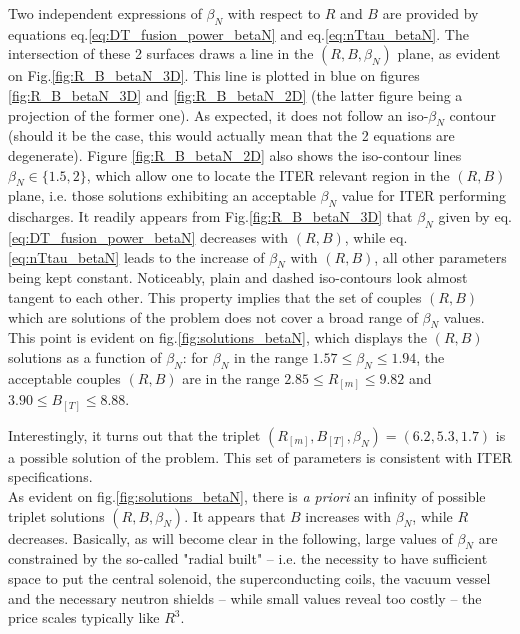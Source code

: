 Two independent expressions of $\beta_N$ with respect to $R$ and $B$ are provided by equations eq.\ref{eq:DT_fusion_power_betaN} and eq.\ref{eq:nTtau_betaN}. The intersection of these 2 surfaces draws a line in the $(R,B,\beta_N)$ plane, as evident on Fig.\ref{fig:R_B_betaN_3D}. This line is plotted in blue on figures \ref{fig:R_B_betaN_3D} and \ref{fig:R_B_betaN_2D} (the latter figure being a projection of the former one). As expected, it does not follow an iso-$\beta_N$ contour (should it be the case, this would actually mean that the 2 equations are degenerate). Figure \ref{fig:R_B_betaN_2D} also shows the iso-contour lines $\beta_N \in \{1.5, 2\}$, which allow one to locate the ITER relevant region in the $(R,B)$ plane, i.e. those solutions exhibiting an acceptable $\beta_N$ value for ITER performing discharges. 
It readily appears from Fig.\ref{fig:R_B_betaN_3D} that $\beta_N$ given by eq.\ref{eq:DT_fusion_power_betaN} decreases with $(R,B)$, while eq.\ref{eq:nTtau_betaN} leads to the increase of $\beta_N$ with $(R,B)$, all other parameters being kept constant.
Noticeably, plain and dashed iso-contours look almost tangent to each other. This property implies that the set of couples $(R,B)$ which are solutions of the problem does not cover a broad range of $\beta_N$ values. This point is evident on fig.\ref{fig:solutions_betaN}, which displays the $(R,B)$ solutions as a function of $\beta_N$: for $\beta_N$ in the range $1.57 \leq \beta_N \leq 1.94$, the acceptable couples $(R,B)$ are in the range $2.85 \leq R_{[m]} \leq 9.82$ and $3.90 \leq B_{[T]} \leq 8.88$.

Interestingly, it turns out that the triplet $(R_{[m]},B_{[T]},\beta_N) = (6.2, 5.3, 1.7)$ is a possible solution of the problem. This set of parameters is consistent with ITER specifications. \\

As evident on fig.\ref{fig:solutions_betaN}, there is \emph{a priori} an infinity of possible triplet solutions $(R,B,\beta_N)$. It appears that $B$ increases with $\beta_N$, while $R$ decreases. Basically, as will become clear in the following, large values of  $\beta_N$ are constrained by the so-called "radial built" -- i.e. the necessity to have sufficient space to put the central solenoid, the superconducting coils, the vacuum vessel and the necessary neutron shields -- while small values reveal too costly -- the price scales typically like $R^3$.

